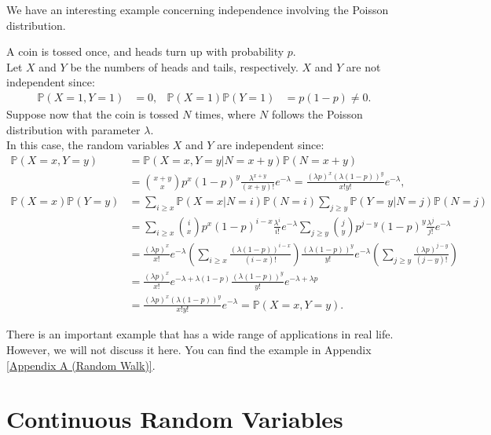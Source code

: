 \documentclass{huhtakm-template-book-v2}
\newcommand{\prob}{\mathbb{P}}
\begin{document}
    We have an interesting example concerning independence involving the Poisson distribution.
    \begin{eg}
        A coin is tossed once, and heads turn up with probability $p$.\\
        Let $X$ and $Y$ be the numbers of heads and tails, respectively. $X$ and $Y$ are not independent since:
        \begin{align*}
            \prob(X = 1,Y = 1) &= 0, & \prob(X = 1)\prob(Y = 1) &= p(1-p) \neq 0.
        \end{align*}
        Suppose now that the coin is tossed $N$ times, where $N$ follows the Poisson distribution with parameter $\lambda$.\\
        In this case, the random variables $X$ and $Y$ are independent since:
        \begin{align*}
            \prob(X = x,Y = y) &= \prob(X = x,Y = y|N = x+y)\prob(N = x+y)\\
            &= \binom{x+y}{x}p^{x}(1-p)^{y}\frac{\lambda^{x+y}}{(x+y)!}e^{-\lambda} = \frac{(\lambda p)^{x}(\lambda(1-p))^{y}}{x!y!}e^{-\lambda},\\
            \prob(X = x)\prob(Y = y) &= \sum_{i \geq x}\prob(X = x|N = i)\prob(N = i)\sum_{j \geq y}\prob(Y = y|N = j)\prob(N = j)\\
            &= \sum_{i \geq x}\binom{i}{x}p^{x}(1-p)^{i-x}\frac{\lambda^{i}}{i!}e^{-\lambda}\sum_{j \geq y}\binom{j}{y}p^{j-y}(1-p)^{y}\frac{\lambda^{j}}{j!}e^{-\lambda}\\
            &= \frac{(\lambda p)^{x}}{x!}e^{-\lambda}\left(\sum_{i \geq x}\frac{(\lambda(1-p))^{i-x}}{(i-x)!}\right)\frac{(\lambda(1-p))^{y}}{y!}e^{-\lambda}\left(\sum_{j \geq y}\frac{(\lambda p)^{j-y}}{(j-y)!}\right)\\
            &= \frac{(\lambda p)^{x}}{x!}e^{-\lambda+\lambda(1-p)}\frac{(\lambda(1-p))^{y}}{y!}e^{-\lambda+\lambda p}\\
            &= \frac{(\lambda p)^{x}(\lambda(1-p))^{y}}{x!y!}e^{-\lambda} = \prob(X = x,Y = y).
        \end{align*}
    \end{eg}
    There is an important example that has a wide range of applications in real life. However, we will not discuss it here. You can find the example in Appendix \ref{Appendix A (Random Walk)}.

\chapter{Continuous Random Variables}
    \label{Chapter 5 (Continuous Random Variables)}
\end{document}
